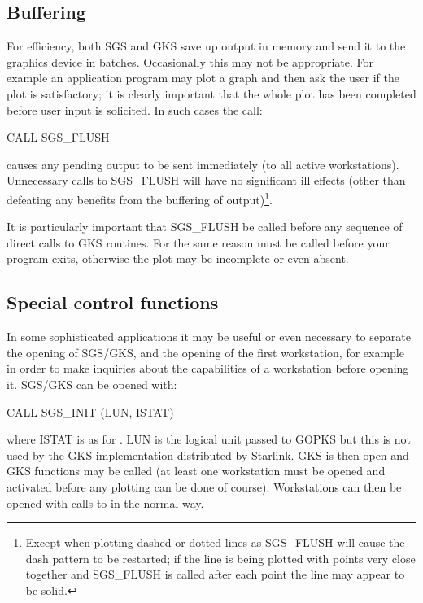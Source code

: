 \documentclass[11pt]{starlink}
\begin{document}
\subsection {Buffering}

For efficiency, both SGS and GKS save up output
in memory and send it to the graphics device
in batches.  Occasionally
this may not be appropriate.  For example an application program
may plot a graph and then ask the user if the plot is
satisfactory;  it
is clearly important that the whole plot has been completed
before user input is
solicited.  In such cases the call:
\begin{terminalv}
CALL SGS_FLUSH
\end{terminalv}
causes any pending output to be sent immediately (to all active
workstations).  Unnecessary calls to SGS\_FLUSH will have no significant
ill effects (other than defeating any benefits from the buffering of
output)\footnote{Except when plotting dashed or dotted lines as SGS\_FLUSH will
cause the dash pattern to be restarted; if the line is being plotted with
points very close together and SGS\_FLUSH is called after each point the
line may appear to be solid.}.

It is particularly important that SGS\_FLUSH be called
before any sequence of direct calls to GKS routines.
For the same reason
 must be called before your program exits,
otherwise the plot may be incomplete or even absent.

\subsection {Special control functions}\label{sec-special}

In some sophisticated applications it may be useful or even necessary to
separate the opening of SGS/GKS, and the opening of the first workstation,
for example in order to make inquiries about the capabilities of a workstation
before opening it. SGS/GKS can be opened with:
\begin{terminalv}
CALL SGS_INIT (LUN, ISTAT)
\end{terminalv}
where ISTAT is as for . LUN is the logical
unit passed to GOPKS but this is not used by the GKS implementation
distributed by Starlink.
GKS is then open and GKS functions
may be called (at least one workstation must be opened and activated before
any plotting can be done of course). Workstations can then be opened with
calls to  in the normal way.
\end{document}
